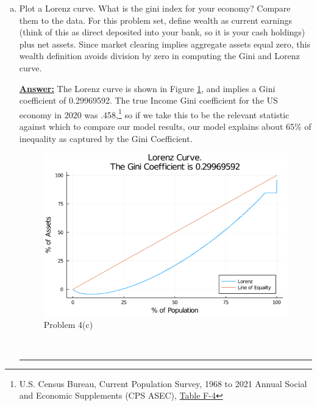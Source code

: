 \documentclass{article} %
\theoremstyle{definition}
\newenvironment{solution}[1][Answer]{\begin{singlespace}\underline{\textbf{#1:}}\quad }{\ \rule{0.3em}{0.3em}\end{singlespace}} %
\begin{document}
\begin{enumerate}[I.]
\begin{enumerate}[4.]
\begin{enumerate}[a.]
				\item Plot a Lorenz curve. What is the gini index for your economy? Compare them to the data. For this problem set, define wealth as current earnings (think of this as direct deposited
				into your bank, so it is your cash holdings) plus net assets. Since market clearing implies aggregate assets equal zero, this wealth definition avoids division by zero in computing the Gini and Lorenz curve.
				\begin{solution}
				The Lorenz curve is shown in Figure \ref{4c}, and implies a Gini coefficient of 0.29969592. The true Income Gini coefficient for the US economy in 2020 was .458,\footnote{U.S. Census Bureau, Current Population Survey, 1968 to 2021 Annual Social and Economic Supplements (CPS ASEC), \href{https://www2.census.gov/programs-surveys/cps/tables/time-series/historical-income-families/f04.xlsx}{Table F-4}} so if we take this to be the relevant statistic against which to compare our model results, our model explains about 65\% of inequality as captured by the Gini Coefficient.
				\begin{figure}[htbp!]
					\centering
					\includegraphics[scale=.5]{ForIncludingInDocument/Lorenz.png}
					\caption{Problem 4(c) \label{4c}}
					\end{figure}
				\end{solution}
			\end{enumerate}
		\end{enumerate}


\end{enumerate}
\end{document}
